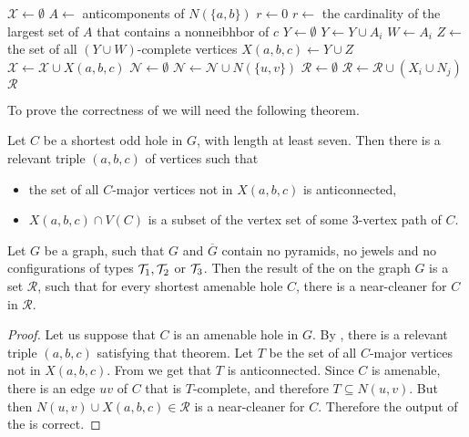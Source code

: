 \begin{algorithmic}[1]
	\ls $\mathcal{X} \gets \emptyset$
		\ls $A \gets$ anticomponents of $N(\{a, b\})$
			\ls $r \gets 0$
		\mElse
			\ls $r \gets$ the cardinality of the largest set of $A$ that contains 
			\lsx a nonneibhbor of $c$ 
		\mEndIf
		\ls $Y \gets \emptyset$ 
				\ls $Y \gets Y \cup A_i$
			\mEndIf
				\ls $W \gets A_i$
			\mEndIf
		\mEndFor
		\ls $Z \gets$ the set of all $(Y \cup W)$-complete vertices
		\ls $X(a, b, c) \gets Y \cup Z$ 
		\ls $\mathcal{X} \gets \mathcal{X} \cup X(a, b, c)$
	\mEndFor
	\ls $\mathcal{N} \gets \emptyset$
		\ls $\mathcal{N} \gets \mathcal{N} \cup N(\{u, v\})$
	\mEndFor
	\ls $\mathcal{R} \gets \emptyset$
			\ls $\mathcal{R} \gets \mathcal{R} \cup (X_i \cup N_j)$ \label{line:listNCcalcR}
		\mEndFor
	\mEndFor
	\ls \RETURN $\mathcal{R}$
	\mEndProcedure
\end{algorithmic}

To prove the correctness of  we will need the following theorem.

\begin{theorem}
	\label{thm:91}
	Let $C$ be a shortest odd hole in $G$, with length at least seven. Then there is a relevant triple $(a, b, c)$ of vertices such that
	\begin{itemize}
		\item the set of all $C$-major vertices not in $X(a, b, c)$ is anticonnected,
		\item $X(a, b, c) \cap V(C)$ is a subset of the vertex set of some 3-vertex path of $C$.
	\end{itemize}
\end{theorem}

\begin{theorem}
	\label{thm:92}
	Let $G$ be a graph, such that $G$ and $\overline{G}$ contain no pyramids, no jewels and no configurations of types $\mathcal{T}_1, \mathcal{T}_2$ or $\mathcal{T}_3$. Then the result of the  on the graph $G$ is a set $\mathcal{R}$, such that for every shortest amenable hole $C$, there is a near-cleaner for $C$ in $\mathcal{R}$.
\end{theorem}
\begin{proof}
	Let us suppose that $C$ is an amenable hole in $G$. By , there is a relevant triple $(a, b, c)$ satisfying that theorem. Let $T$ be the set of all $C$-major vertices not in $X(a,b,c)$. From  we get that $T$ is anticonnected. Since $C$ is amenable, there is an edge $uv$ of $C$ that is $T$-complete, and therefore $T \subseteq N(u, v)$. But then $N(u, v) \cup X(a, b, c) \in \mathcal{R}$ is a near-cleaner for $C$. Therefore the output of the  is correct.
\end{proof}

